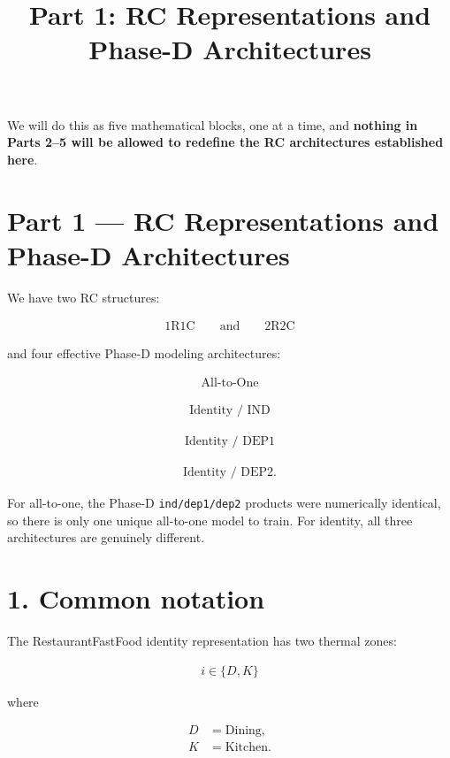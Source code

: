 \documentclass[11pt]{article}
\title{Part 1: RC Representations and Phase-D Architectures}
\author{}
\date{}
\begin{document}
\maketitle

We will do this as five mathematical blocks, one at a time, and \textbf{nothing in Parts 2--5 will be allowed to redefine the RC architectures established here}.

\section*{Part 1 --- RC Representations and Phase-D Architectures}

We have two RC structures:

\begin{align}
\boxed{\text{1R1C}}
\qquad\text{and}\qquad
\boxed{\text{2R2C}}
\end{align}

and four effective Phase-D modeling architectures:

\begin{align}
\boxed{\text{All-to-One}}
\end{align}

\begin{align}
\boxed{\text{Identity / IND}}
\end{align}

\begin{align}
\boxed{\text{Identity / DEP1}}
\end{align}

\begin{align}
\boxed{\text{Identity / DEP2}}.
\end{align}

For all-to-one, the Phase-D \texttt{ind/dep1/dep2} products were numerically identical, so there is only one unique all-to-one model to train. For identity, all three architectures are genuinely different.

\section*{1. Common notation}

The RestaurantFastFood identity representation has two thermal zones:

\begin{align}
i\in\{D,K\}
\end{align}

where

\begin{align}
D&=\text{Dining},\\
K&=\text{Kitchen}.
\end{align}
\end{document}
